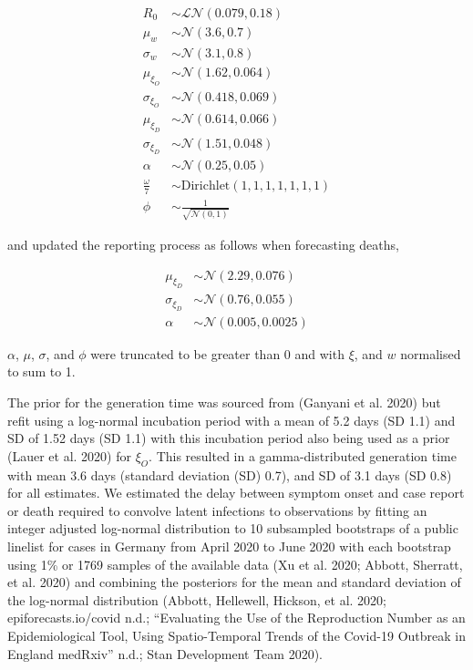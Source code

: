 \documentclass[
]{article}
\begin{document}
\begin{align}
     R_0 &\sim \mathcal{LN}(0.079, 0.18) \\
    \mu_w &\sim \mathcal{N}(3.6, 0.7) \\
    \sigma_w &\sim \mathcal{N}(3.1, 0.8) \\
    \mu_{\xi_{O}} &\sim \mathcal{N}(1.62, 0.064) \\
    \sigma_{\xi_{O}} &\sim \mathcal{N}(0.418, 0.069) \\
    \mu_{\xi_{D}} &\sim \mathcal{N}(0.614, 0.066) \\
    \sigma_{\xi_{D}} &\sim \mathcal{N}(1.51, 0.048) \\
    \alpha &\sim \mathcal{N}(0.25, 0.05) \\
    \frac{\omega}{7} &\sim \mathrm{Dirichlet}(1, 1, 1, 1, 1, 1, 1) \\
    \phi &\sim \frac{1}{\sqrt{\mathcal{N}(0, 1)}}
\end{align}

and updated the reporting process as follows when forecasting deaths,

\begin{align}
    \mu_{\xi_{D}} &\sim \mathcal{N}(2.29, 0.076) \\
    \sigma_{\xi_{D}} &\sim \mathcal{N}(0.76, 0.055) \\
    \alpha &\sim \mathcal{N}(0.005, 0.0025) 
\end{align}

\(\alpha\), \(\mu\), \(\sigma\), and \(\phi\) were truncated to be greater than 0 and with \(\xi\), and \(w\) normalised to sum to 1.

The prior for the generation time was sourced from (Ganyani et al. 2020) but refit using a log-normal incubation period with a mean of 5.2 days (SD 1.1) and SD of 1.52 days (SD 1.1) with this incubation period also being used as a prior (Lauer et al. 2020) for \(\xi_{O}\). This resulted in a gamma-distributed generation time with mean 3.6 days (standard deviation (SD) 0.7), and SD of 3.1 days (SD 0.8) for all estimates. We estimated the delay between symptom onset and case report or death required to convolve latent infections to observations by fitting an integer adjusted log-normal distribution to 10 subsampled bootstraps of a public linelist for cases in Germany from April 2020 to June 2020 with each bootstrap using 1\% or 1769 samples of the available data (Xu et al. 2020; Abbott, Sherratt, et al. 2020) and combining the posteriors for the mean and standard deviation of the log-normal distribution (Abbott, Hellewell, Hickson, et al. 2020; epiforecasts.io/covid n.d.; {``Evaluating the Use of the Reproduction Number as an Epidemiological Tool, Using Spatio-Temporal Trends of the {Covid}-19 Outbreak in {England} \textbar{} {medRxiv}''} n.d.; Stan Development Team 2020).
\end{document}
